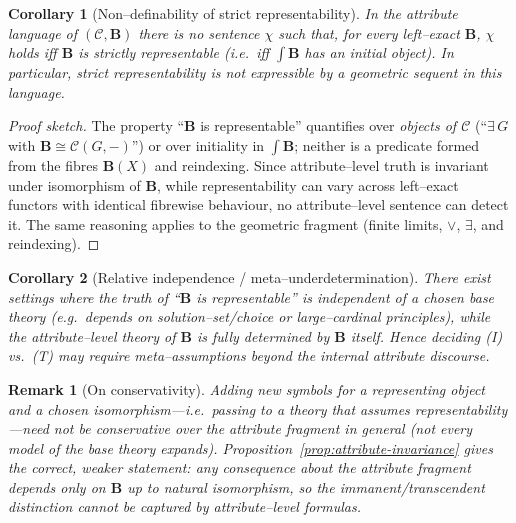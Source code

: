 \documentclass[11pt]{article}
\theoremstyle{upright}
\newtheorem{corollary}{Corollary}
\newtheorem{remark}{Remark}
\begin{document}
\begin{corollary}[Non–definability of strict representability]\label{cor:nondef}
In the attribute language of $(\mathcal C,\mathbf B)$ there is no sentence $\chi$ such that, for every left–exact $\mathbf B$, $\chi$ holds iff $\mathbf B$ is strictly representable (i.e.\ iff $\int\!\mathbf B$ has an initial object). In particular, strict representability is not expressible by a geometric sequent in this language.
\end{corollary}

\begin{proof}[Proof sketch]
The property “$\mathbf B$ is representable” quantifies over \emph{objects of $\mathcal C$} (“$\exists\,G$ with $\mathbf B\cong \mathcal C(G,-)$”) or over initiality in $\int\!\mathbf B$; neither is a predicate formed from the fibres $\mathbf B(X)$ and reindexing. Since attribute–level truth is invariant under isomorphism of $\mathbf B$, while representability can vary across left–exact functors with identical fibrewise behaviour, no attribute–level sentence can detect it. The same reasoning applies to the geometric fragment (finite limits, $\vee$, $\exists$, and reindexing).
\end{proof}

\begin{corollary}[Relative independence / meta–underdetermination]\label{cor:independence}
There exist settings where the truth of “$\mathbf B$ is representable” is independent of a chosen base theory (e.g.\ depends on solution–set/choice or large–cardinal principles), while the attribute–level theory of $\mathbf B$ is fully determined by $\mathbf B$ itself. Hence deciding \textnormal{(I)} vs.\ \textnormal{(T)} may require meta–assumptions \emph{beyond} the internal attribute discourse.
\end{corollary}

\begin{remark}[On conservativity]
Adding new symbols for a representing object and a chosen isomorphism—i.e.\ passing to a theory that \emph{assumes} representability—need not be conservative over the attribute fragment in general (not every model of the base theory expands). Proposition~\ref{prop:attribute-invariance} gives the correct, weaker statement: any consequence \emph{about the attribute fragment} depends only on $\mathbf B$ up to natural isomorphism, so the immanent/transcendent distinction cannot be captured by attribute–level formulas.
\end{remark}
\end{document}
